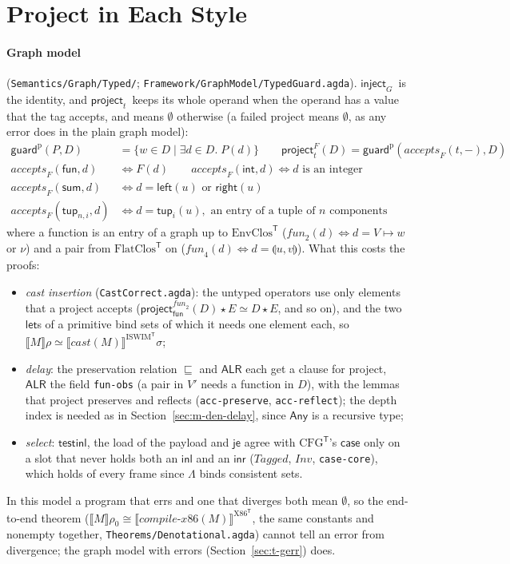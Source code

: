 \documentclass[10pt]{article}
\theoremstyle{acmplain}
\newcommand{\SEM}[1]{\llbracket #1 \rrbracket}
\newcommand{\key}[1]{\mathsf{#1}}
\newcommand{\pass}[1]{\mathit{#1}}
\newcommand{\pairv}[2]{\llparenthesis #1, #2 \rrparenthesis}
\newcommand{\tup}[2]{\key{tup}_{#1}(#2)}
\newcommand{\Left}[1]{\key{left}(#1)}
\newcommand{\Right}[1]{\key{right}(#1)}
\newcommand{\app}{\star}
\newcommand{\obseq}{\cong}
\newcommand{\Tl}[1]{\textrm{#1}^{\mathsf{T}}}  %
\newcommand{\TAny}{\key{Any}}
\newcommand{\Tfun}{\key{fun}}                  %
\newcommand{\Tsum}{\key{sum}}                  %
\newcommand{\Tint}{\key{int}}                  %
\newcommand{\Tttup}[2]{\key{tup}_{#1,#2}}      %
\newcommand{\Tinject}[1]{\key{inject}_{#1}\,}
\newcommand{\Tproject}[1]{\key{project}_{#1}\,}
\newcommand{\Tguard}{\key{guard}^{\mathrm{p}}}            %
\newcommand{\Taccepts}[1]{\mathit{accepts}_{#1}}          %
\newcommand{\Tfuntwo}{\mathit{fun}_2}                     %
\newcommand{\Tfunfour}{\mathit{fun}_4}                    %
\begin{document}
\section{Project in Each Style}\label{sec:t-styles}

\paragraph{Graph model} (\texttt{Semantics/Graph/Typed/};
\texttt{Framework/GraphModel/TypedGuard.agda}). $\Tinject{G}$ is the
identity, and $\Tproject{t}$ keeps its whole operand when the operand has
a value that the tag accepts, and means $\emptyset$ otherwise (a failed
project means $\emptyset$, as any error does in the plain graph model):
\begin{align*}
  \Tguard(P, D) &= \{ w \in D \mid \exists d \in D.\; P(d) \} \qquad
  \key{project}^{F}_t(D) = \Tguard(\Taccepts{F}(t, -), D) \\
  \Taccepts{F}(\Tfun, d) &\iff F(d) \qquad
  \Taccepts{F}(\Tint, d) \iff d \text{ is an integer} \\
  \Taccepts{F}(\Tsum, d) &\iff d = \Left{u} \text{ or } \Right{u} \\
  \Taccepts{F}(\Tttup{n}{i}, d) &\iff d = \tup{i}{u}, \text{ an entry of a tuple of } n \text{ components}
\end{align*}
where a function is an entry of a graph up to $\Tl{EnvClos}$
($\Tfuntwo(d) \iff d = V \mapsto w$ or $\nu$) and a pair from $\Tl{FlatClos}$
on ($\Tfunfour(d) \iff d = \pairv{u}{v}$). What this costs the proofs:
\begin{itemize}
\item \emph{cast insertion} (\texttt{CastCorrect.agda}): the untyped
  operators use only elements that a project accepts
  ($\key{project}^{\Tfuntwo}_{\Tfun}(D) \app E \simeq D \app E$, and so on),
  and the two $\key{let}$s of a primitive bind sets of which it needs one
  element each, so $\SEM{M}\rho \simeq \SEM{\pass{cast}(M)}^{\Tl{ISWIM}}\sigma$;
\item \emph{delay}: the preservation relation $\sqsubseteq$ and
  $\mathsf{ALR}$ each get a clause for project, $\mathsf{ALR}$ the field
  \texttt{fun-obs} (a pair in $V'$ needs a function in $D$), with the
  lemmas that project preserves and reflects (\texttt{acc-preserve},
  \texttt{acc-reflect}); the depth index is needed as in
  Section~\ref{sec:m-den-delay}, since $\TAny$ is a recursive type;
\item \emph{select}: $\key{testinl}$, the load of the payload and $\key{je}$
  agree with $\Tl{CFG}$'s $\key{case}$ only on a slot that never holds both
  an $\key{inl}$ and an $\key{inr}$ ($\mathit{Tagged}$, $\mathit{Inv}$,
  \texttt{case-core}), which holds of every frame since $\Lambda$ binds
  consistent sets.
\end{itemize}
In this model a program that errs and one that diverges both mean
$\emptyset$, so the end-to-end theorem ($\SEM{M}\rho_0 \obseq
\SEM{\pass{compile\text{-}x86}(M)}^{\Tl{X86}}$, the same constants and
nonempty together, \texttt{Theorems/Denotational.agda}) cannot tell an error
from divergence; the graph model with errors (Section~\ref{sec:t-gerr})
does.
\end{document}
